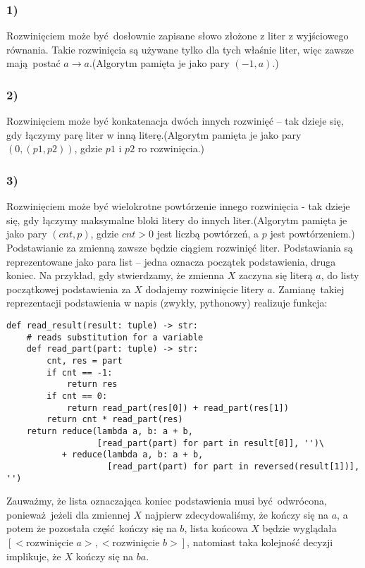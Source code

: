 \documentclass[leqno, 12pt]{article}
\begin{document}
\subsubsection*{1)} Rozwinięciem może być dosłownie zapisane słowo złożone z liter z wyjściowego równania. Takie rozwinięcia są używane tylko dla tych właśnie liter, więc zawsze mają postać $a \rightarrow a$.\newline (Algorytm pamięta je jako pary $(-1, a)$.)

\subsubsection*{2)}
Rozwinięciem może być konkatenacja dwóch innych rozwinięć -- tak dzieje się, gdy łączymy parę liter w inną literę.\newline (Algorytm pamięta je jako pary $(0, (p1, p2))$, gdzie $p1$ i $p2$ ro rozwinięcia.)

\subsubsection*{3)}
Rozwinięciem może być wielokrotne powtórzenie innego rozwinięcia - tak dzieje się, gdy łączymy maksymalne bloki litery do innych liter.\newline (Algorytm pamięta je jako pary $(cnt, p)$, gdzie $cnt > 0$ jest liczbą powtórzeń, a $p$ jest powtórzeniem.)
\newline\newline\newline
Podstawianie za zmienną zawsze będzie ciągiem rozwinięć liter. Podstawiania są reprezentowane jako para list -- jedna oznacza początek podstawienia, druga koniec. Na przykład, gdy stwierdzamy, że zmienna $X$ zaczyna się literą $a$, do listy początkowej podstawienia za $X$ dodajemy rozwinięcie litery $a$.
\newline\newline
Zamianę takiej reprezentacji podstawienia w napis (zwykły, pythonowy) realizuje funkcja:
\begin{verbatim}
def read_result(result: tuple) -> str:
    # reads substitution for a variable
    def read_part(part: tuple) -> str:
        cnt, res = part
        if cnt == -1:
            return res
        if cnt == 0:
            return read_part(res[0]) + read_part(res[1])
        return cnt * read_part(res)
    return reduce(lambda a, b: a + b,
                  [read_part(part) for part in result[0]], '')\
           + reduce(lambda a, b: a + b,
                    [read_part(part) for part in reversed(result[1])], '')
\end{verbatim}
Zauważmy, że lista oznaczająca koniec podstawienia musi być odwrócona, ponieważ jeżeli dla zmiennej $X$ najpierw zdecydowaliśmy, że kończy się na $a$, a potem że pozostała część kończy się na $b$, lista końcowa $X$ będzie wyglądała \newline$[<\text{rozwinięcie }a>, <\text{rozwinięcie }b>]$, natomiast taka kolejność decyzji implikuje, że $X$ kończy się na $ba$.
\end{document}
